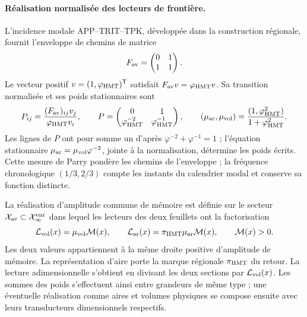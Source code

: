 \paragraph{Réalisation normalisée des lecteurs de frontière.}
L'incidence modale APP--TRIT--TPK, développée dans la construction régionale, fournit l'enveloppe de chemins de matrice
\[
 F_{\rm av}=\begin{pmatrix}0&1\\1&1\end{pmatrix}.
\]
Le vecteur positif \(v=(1,\varphi_{\rm HMT})^{\mathsf T}\) satisfait \(F_{\rm av}v=\varphi_{\rm HMT}v\). Sa transition normalisée et ses poids stationnaires sont
\begin{equation}
 P_{ij}=\frac{(F_{\rm av})_{ij}v_j}{\varphi_{\rm HMT}v_i},
 \qquad
 P=\begin{pmatrix}0&1\\
 \varphi_{\rm HMT}^{-2}&\varphi_{\rm HMT}^{-1}\end{pmatrix},
 \qquad
 (\mu_{\rm ar},\mu_{\rm vol})
 =\frac{(1,\varphi_{\rm HMT}^{2})}{1+\varphi_{\rm HMT}^{2}}.
 \label{vii:eq:lectores-parry}
\end{equation}
Les lignes de \(P\) ont pour somme un d'après
\(\varphi^{-2}+\varphi^{-1}=1\) ; l'équation stationnaire
\(\mu_{\rm ar}=\mu_{\rm vol}\varphi^{-2}\), jointe à la
normalisation, détermine les poids écrits. Cette mesure de Parry
pondère les chemins de l'enveloppe ; la fréquence chronologique
\((1/3,2/3)\) compte les instants du calendrier modal et conserve
sa fonction distincte.

La réalisation d'amplitude commune de mémoire est définie sur le secteur
\(\mathcal X_{\rm av}\subset\mathcal X_\infty^{\rm enr}\) dans lequel
les lecteurs des deux feuillets ont la factorisation
\begin{equation}
 \mathcal L_{\rm vol}(x)=\mu_{\rm vol}\mathcal M(x),\qquad
 \mathcal L_{\rm ar}(x)=\pi_{\rm HMT}\mu_{\rm ar}\mathcal M(x),
 \qquad \mathcal M(x)>0.
 \label{vii:eq:lectores-amplitud-comun}
\end{equation}
Les deux valeurs appartiennent à la même droite positive d'amplitude de mémoire. La représentation d'aire porte la marque régionale \(\pi_{\rm HMT}\) du retour. La lecture adimensionnelle s'obtient en divisant les deux sections par \(\mathcal L_{\rm vol}(x)\). Les sommes des poids s'effectuent ainsi entre grandeurs de même type ; une éventuelle réalisation comme aires et volumes physiques se compose ensuite avec leurs transducteurs dimensionnels respectifs.

